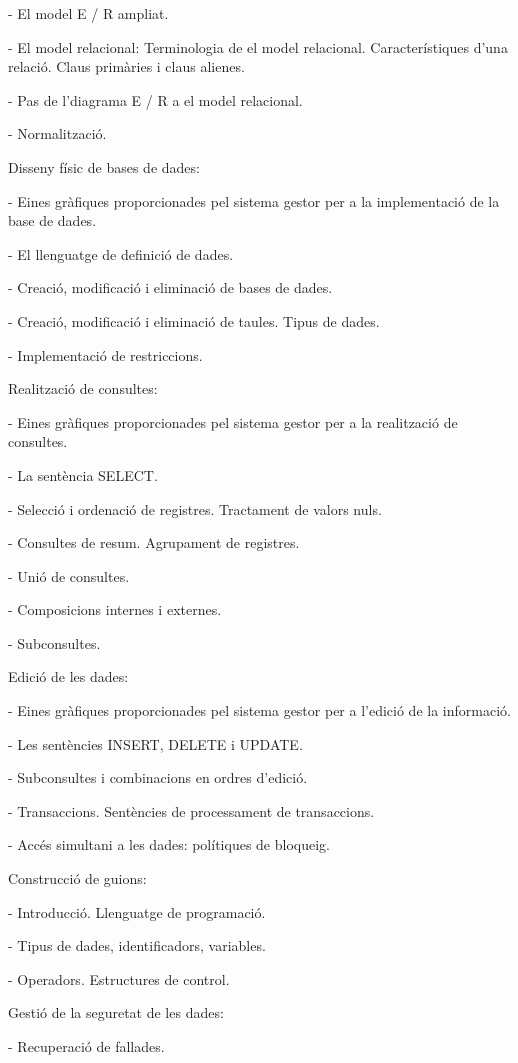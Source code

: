 \documentclass[catalan, a4paper, 12pt, titlepage]{article}
\begin{document}
- El model E / R ampliat.

- El model relacional: Terminologia de el model relacional. Característiques d'una relació. Claus primàries i claus alienes.

- Pas de l'diagrama E / R a el model relacional.

- Normalització.

Disseny físic de bases de dades:

- Eines gràfiques proporcionades pel sistema gestor per a la implementació de la base de dades.

- El llenguatge de definició de dades.

- Creació, modificació i eliminació de bases de dades.

- Creació, modificació i eliminació de taules. Tipus de dades.

- Implementació de restriccions.

Realització de consultes:

- Eines gràfiques proporcionades pel sistema gestor per a la realització de consultes.

- La sentència SELECT.

- Selecció i ordenació de registres. Tractament de valors nuls.

- Consultes de resum. Agrupament de registres.

- Unió de consultes.

- Composicions internes i externes.

- Subconsultes.

Edició de les dades:

- Eines gràfiques proporcionades pel sistema gestor per a l'edició de la informació.

- Les sentències INSERT, DELETE i UPDATE.

- Subconsultes i combinacions en ordres d'edició.

- Transaccions. Sentències de processament de transaccions.

- Accés simultani a les dades: polítiques de bloqueig.

Construcció de guions:

- Introducció. Llenguatge de programació.

- Tipus de dades, identificadors, variables.

- Operadors. Estructures de control.

Gestió de la seguretat de les dades:

- Recuperació de fallades.
\end{document}
